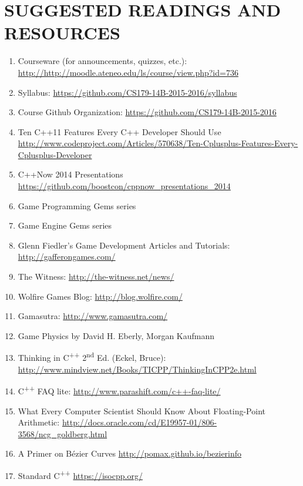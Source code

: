 \documentclass[10pt]{article}
\begin{document}
\section{SUGGESTED READINGS AND RESOURCES}
\begin{enumerate}[noitemsep]
\item Courseware (for announcements, quizzes, etc.): \url{http://http://moodle.ateneo.edu/ls/course/view.php?id=736}
\item Syllabus: \url{https://github.com/CS179-14B-2015-2016/syllabus}
\item Course Github Organization: \url{https://github.com/CS179-14B-2015-2016}
\item Ten C++11 Features Every C++ Developer Should Use \\\url{http://www.codeproject.com/Articles/570638/Ten-Cplusplus-Features-Every-Cplusplus-Developer}
\item C++Now 2014 Presentations \url{https://github.com/boostcon/cppnow_presentations_2014}
\item Game Programming Gems series
\item Game Engine Gems series
\item Glenn Fiedler's Game Development Articles and Tutorials: \url{http://gafferongames.com/}
\item The Witness: \url{http://the-witness.net/news/}
\item Wolfire Games Blog: \url{http://blog.wolfire.com/}
\item Gamasutra: \url{http://www.gamasutra.com/}
\item Game Physics by David H. Eberly, Morgan Kaufmann
\item Thinking in C\textsuperscript{++} 2\textsuperscript{nd} Ed. (Eckel, Bruce): \\\url{http://www.mindview.net/Books/TICPP/ThinkingInCPP2e.html}
\item C\textsuperscript{++} FAQ lite: \url{http://www.parashift.com/c++-faq-lite/}
\item What Every Computer Scientist Should Know About Floating-Point Arithmetic: \url{http://docs.oracle.com/cd/E19957-01/806-3568/ncg_goldberg.html}
\item A Primer on Bézier Curves \url{http://pomax.github.io/bezierinfo}
\item Standard C\textsuperscript{++} \url{https://isocpp.org/}
\end{enumerate}
\end{document}

